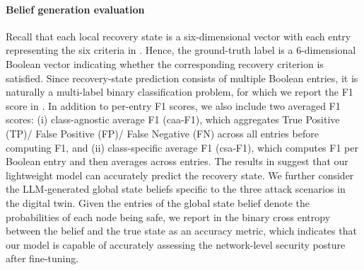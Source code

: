 \documentclass[sigconf]{acmart}
\begin{document}
\paragraph{Belief generation evaluation}
 Recall that each local recovery state is a six-dimensional vector with each entry representing the six criteria in . Hence, the ground-truth label is a 6-dimensional Boolean vector indicating whether the corresponding recovery criterion is satisfied. Since recovery-state prediction consists of multiple Boolean entries, it is naturally a multi-label binary classification problem, for which we report the F1 score in . In addition to per-entry F1 scores, we also include two averaged F1 scores: (i) {class-agnostic average F1} (caa-F1), which aggregates True Positive (TP)/ False Positive (FP)/ False Negative (FN) across all entries before computing F1, and (ii) {class-specific average F1} (csa-F1),
which computes F1 per Boolean entry and then averages across entries. The results in  suggest that our lightweight model can accurately predict the recovery state. We further consider the LLM-generated global state beliefs specific to the three attack scenarios in the digital twin. Given the entries of the global state belief denote the probabilities of each node being safe, we report in  the binary cross entropy between the belief and the true state as an accuracy metric, which indicates that our model is capable of accurately assessing the network-level security posture after fine-tuning.  
\begin{table}[h]
      \centering
      \caption{Local state prediction F1 scores. In addition to per-entry F1, the class-agnostic average (caa) and class-specific average (csa) scores indicate that our model performs well on the test data.}
      \label{tab:belief-f1}
  \end{table}
\end{document}
